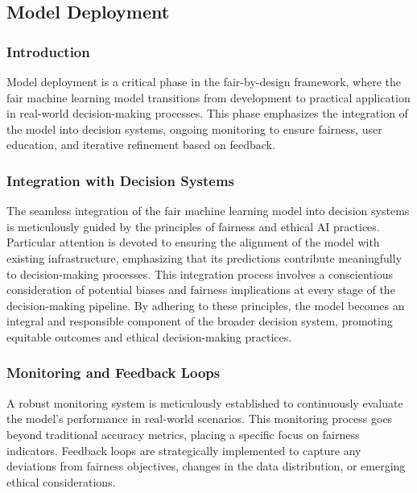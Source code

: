 \subsection{Model Deployment}
\label{subsection:model-deployment}


\subsubsection{Introduction}

Model deployment is a critical phase in the fair-by-design framework, where the fair machine learning model transitions from development to practical application in real-world decision-making processes. This phase emphasizes the integration of the model into decision systems, ongoing monitoring to ensure fairness, user education, and iterative refinement based on feedback.

\subsubsection{Integration with Decision Systems}

The seamless integration of the fair machine learning model into decision systems is meticulously guided by the principles of fairness and ethical AI practices. Particular attention is devoted to ensuring the alignment of the model with existing infrastructure, emphasizing that its predictions contribute meaningfully to decision-making processes. This integration process involves a conscientious consideration of potential biases and fairness implications at every stage of the decision-making pipeline. By adhering to these principles, the model becomes an integral and responsible component of the broader decision system, promoting equitable outcomes and ethical decision-making practices.

\subsubsection{Monitoring and Feedback Loops}

A robust monitoring system is meticulously established to continuously evaluate the model's performance in real-world scenarios. This monitoring process goes beyond traditional accuracy metrics, placing a specific focus on fairness indicators. Feedback loops are strategically implemented to capture any deviations from fairness objectives, changes in the data distribution, or emerging ethical considerations.

